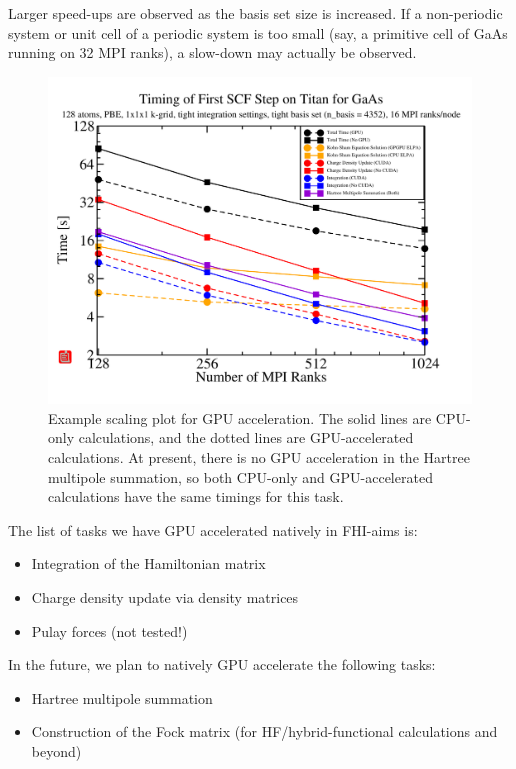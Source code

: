 Larger speed-ups are observed as the basis set size is increased.  If a non-periodic system or unit cell of a periodic system is too small (say, a primitive cell of GaAs running on 32 MPI ranks), a slow-down may actually be observed.

\begin{figure}
  \includegraphics[width=\linewidth]{GaAs_4x4x4Supercell_NoPrecond_GPUBatchSize200}
  \caption{Example scaling plot for GPU acceleration.  The solid lines are CPU-only calculations, and the dotted lines are GPU-accelerated calculations.  At present, there is no GPU acceleration in the Hartree multipole summation, so both CPU-only and GPU-accelerated calculations have the same timings for this task.}
    \label{fig:GPU_Scaling}
\end{figure}

The list of tasks we have GPU accelerated natively in FHI-aims is:
\begin{itemize}
	\item Integration of the Hamiltonian matrix
	\item Charge density update via density matrices
	\item Pulay forces (not tested!)
\end{itemize}
In the future, we plan to natively GPU accelerate the following tasks:
\begin{itemize}
	\item Hartree multipole summation
	\item Construction of the Fock matrix (for HF/hybrid-functional calculations and beyond)
\end{itemize}


